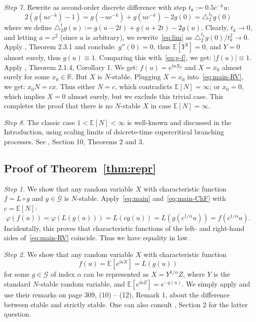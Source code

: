\documentclass[12pt]{amsart}
\theoremstyle{remark}
\theoremstyle{definition}
\begin{document}
{\it Step 7.} Rewrite as second-order discrete difference with step $t_k := 0.5c^{-k}u$:
$$
2(g(uc^{-k}) - 1) = g(-uc^{-k}) + g(uc^{-k}) - 2g(0) = \triangle^{t_k}_2g(0)
$$
where we define $\triangle ^t_2g(u) := g(u - 2t) + g(u + 2t) - 2g(u)$. Clearly, $t_k \to 0$, and letting $a = c^2$ (since $a$ is arbitrary), we rewrite~\eqref{eq:lim} as 
$\triangle_{2}^{t_k}g(0)/t_k^2 \to 0$. Apply \cite[Chapter 2]{FTbook}, Theorem 2.3.1 and conclude: $g''(0) = 0$, thus $\mathbb E[Y^2] = 0$, and $Y = 0$ almost surely, thus $g(u) \equiv 1$. Comparing this with~\eqref{eq:g-f}, we get: $|f(u)| \equiv 1$. Apply \cite[Chapter 2]{FTbook}, Theorem 2.1.4, Corollary 1. We get: $f(u) = e^{\mathrm{i}uX_0}$ and $X = x_0$ almost surely for some $x_0 \in \mathbb R$. But $X$ is $N$-stable. Plugging $X = x_0$ into~\eqref{eq:main-RV}, we get: $x_0N = cx$. Thus either $N = c$, which contradicts $\mathbb E[N] = \infty$; or $x_0 = 0$, which implies $X = 0$ almost surely, but we exclude this trivial case. This completes the proof that there is no $N$-stable $X$ in case $\mathbb E[N] = \infty$. 

{\it Step 8.} The classic case $1 < \mathbb E[N] < \infty$ is well-known and discussed in the Introduction, using scaling limits of dsicrete-time supercritical branching processes. See \cite[Chapter I]{AthreyaBook}, Section 10, Theorems 2 and 3.

\subsection{Proof of Theorem~\ref{thm:repr}} 

{\it Step 1.} We show that any random variable $X$ with characteristic function $f = L \circ g$ and $g \in \mathcal G$ is $N$-stable. Apply~\eqref{eq:main} and~\eqref{eq:main-ChF} with $c = \mathbb E[N]$:
$$
\varphi(f(u)) = \varphi(L(g(u))) = L(cg(u)) = L(g(c^{1/\alpha}u)) = f(c^{1/\alpha}u).
$$
Incidentally, this proves that characteristic functions of the left- and right-hand sides of~\eqref{eq:main-RV} coincide. Thus we have equality in law. 

{\it Step 2.} We show that any random variable $X$ with characteristic function 
$$
f(u) = \mathbb E\left[e^{\mathrm{i}uX}\right] = L(g(u))
$$
for some $g \in \mathcal G$ of index $\alpha$ can be represented as $X = Y^{1/\alpha}Z$, where $Y$ is the standard $N$-stable random variable, and $\mathbb E\left[e^{\mathrm{i}uZ}\right] = e^{-g(u)}$. We simply apply \cite[Proposition 3.1]{Anna} and use their remarks on page 309, (10) -- (12), Remark 1, about the difference between stable and strictly stable. One can also consult \cite[Chapter 1]{STbook}, Section 2 for the latter question. 
\end{document}
